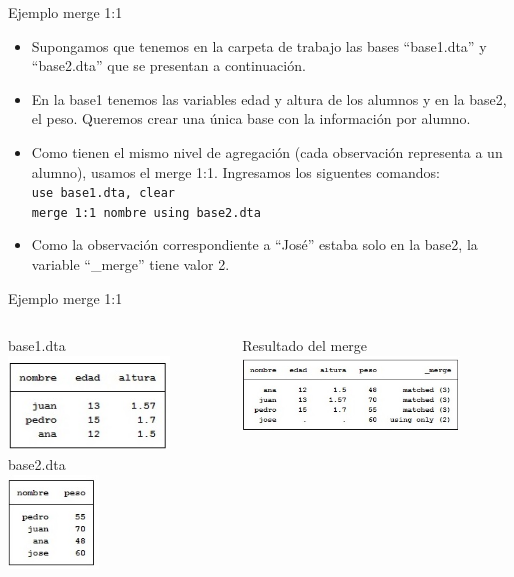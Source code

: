 \documentclass{beamer}
\begin{document}
\begin{frame}{Ejemplo merge 1:1}
\begin{itemize}
\item Supongamos que tenemos en la carpeta de trabajo las bases ``base1.dta'' y ``base2.dta'' que se presentan a continuación. 
\item En la base1 tenemos las variables edad y altura de los alumnos y en la base2, el peso. Queremos crear una única base con la información por alumno. 
\item Como tienen el mismo nivel de agregación (cada observación representa a un alumno), usamos el merge 1:1. Ingresamos los siguentes comandos:\\\smallskip
\texttt{use base1.dta, clear}\\
\texttt{merge 1:1 nombre using base2.dta}
\item Como la observación correspondiente a ``José'' estaba solo en la base2, la variable ``\_merge'' tiene valor 2.
\end{itemize}
\end{frame}

\begin{frame}{Ejemplo merge 1:1}
\begin{columns}
\begin{column}{5cm}
base1.dta\\
\includegraphics[height=2.5cm]{base1.jpg}\\\bigskip
base2.dta\\
\includegraphics[height=2.5cm]{base2.jpg}
\end{column}
\begin{column}{5cm}
Resultado del merge\\
\includegraphics[height=2cm]{merge.jpg}
\end{column}
\end{columns}
\end{frame}
\end{document}
